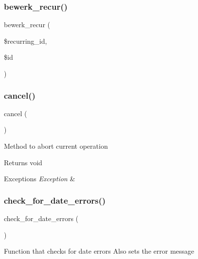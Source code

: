 \subsubsection{bewerk\+\_\+recur()}
{\footnotesize\ttfamily bewerk\+\_\+recur (\begin{DoxyParamCaption}\item[{}]{\$recurring\+\_\+id,  }\item[{}]{\$id }\end{DoxyParamCaption})}

\mbox{\label{classtks__agenda_controller_item_form_a649b2b3005c687ae78c9d1d65e973493}} 
\subsubsection{cancel()}
{\footnotesize\ttfamily cancel (\begin{DoxyParamCaption}{ }\end{DoxyParamCaption})}

Method to abort current operation

\begin{DoxyReturn}{Returns}
void
\end{DoxyReturn}

\begin{DoxyExceptions}{Exceptions}
{\em Exception} & \\
\hline
\end{DoxyExceptions}
\mbox{\label{classtks__agenda_controller_item_form_a1fe2368f6e752f506a5b6f293fd58737}} 
\subsubsection{check\+\_\+for\+\_\+date\+\_\+errors()}
{\footnotesize\ttfamily check\+\_\+for\+\_\+date\+\_\+errors (\begin{DoxyParamCaption}{ }\end{DoxyParamCaption})}

Function that checks for date errors Also sets the error message

